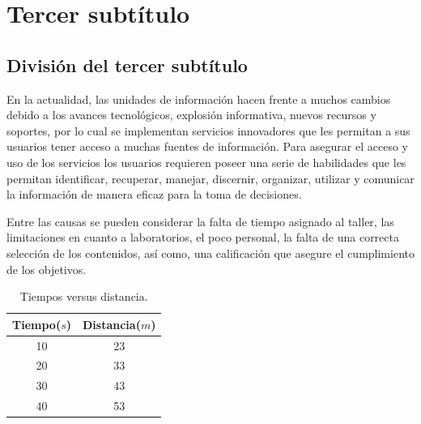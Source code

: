 \section{Tercer subtítulo}

\subsection{División del tercer subtítulo}

En la actualidad, las unidades de información hacen frente a muchos cambios
debido a los avances tecnológicos, explosión informativa, nuevos recursos y
soportes, por lo cual se implementan servicios innovadores que les permitan a
sus usuarios tener acceso a muchas fuentes de información. Para asegurar el
acceso y uso de los servicios los usuarios requieren poseer una serie de
habilidades que les permitan identificar, recuperar, manejar, discernir,
organizar, utilizar y comunicar la información de manera eficaz para la toma de
decisiones.

Entre las causas se pueden considerar la falta de tiempo asignado al taller,
las limitaciones en cuanto a laboratorios, el poco personal, la falta de una
correcta selección de los contenidos, así como, una calificación que asegure el
cumplimiento de los objetivos.

\begin{table}[H]
    \centering
    \begin{tabular}{c|c}
        Tiempo($s$) & Distancia($m$) \\
        \hline
        10 & 23 \\
        20 & 33 \\
        30 & 43 \\
        40 & 53 \\
    \end{tabular}
    \caption{Tiempos versus distancia.}
    \label{tab:tiempo_versus_distancia}
\end{table}